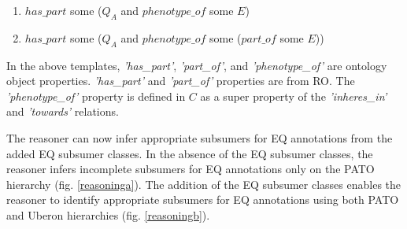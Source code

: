 \documentclass{article}
\begin{document}
\begin{enumerate}
\item $has\_part$ some ($Q_A$ and $phenotype\_of$ some $E$)
\item $has\_part$ some ($Q_A$ and $phenotype\_of$ some ($part\_of$ some $E$))
\end{enumerate}

In the above templates, \textit{'has\_part'}, \textit{'part\_of'}, and \textit{'phenotype\_of'} are ontology object properties. \textit{'has\_part'} and \textit{'part\_of'} properties are from RO. The \textit{'phenotype\_of'} property is defined in $C$ as a super property of the \textit{'inheres\_in'} and \textit{'towards'} relations.


The reasoner can now infer appropriate subsumers for EQ annotations from the added EQ subsumer classes. In the absence of the EQ subsumer classes, the reasoner infers incomplete subsumers for EQ annotations only on the PATO hierarchy (fig. \ref{reasoninga}). The addition of the EQ subsumer classes enables the reasoner to identify appropriate subsumers for EQ annotations using both PATO and Uberon hierarchies (fig. \ref{reasoningb}). 


\end{document}
